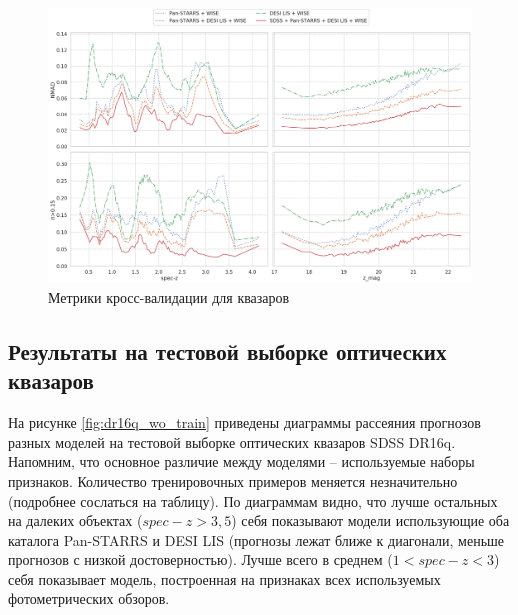 \documentclass[fleqn,usenatbib]{mnras}
\begin{document}
\begin{figure}
    \centering
    \includegraphics[width=0.9\linewidth]{images/metrics-cv2-qso.png}
    \caption{Метрики кросс-валидации для квазаров}
    \label{fig:metrics-cv2-qso}
\end{figure}

\subsection{Результаты на тестовой выборке оптических квазаров}

На рисунке \ref{fig:dr16q_wo_train} приведены диаграммы рассеяния прогнозов разных моделей на тестовой выборке оптических квазаров SDSS DR16q. Напомним, что основное различие между моделями -- используемые наборы признаков. Количество тренировочных примеров меняется незначительно (подробнее сослаться на таблицу). По диаграммам видно, что  лучше остальных на далеких объектах ($spec-z > 3,5$) себя показывают модели использующие оба каталога Pan-STARRS и DESI LIS (прогнозы лежат ближе к диагонали, меньше прогнозов с низкой достоверностью). Лучше всего в среднем ($1 < spec-z < 3$) себя показывает модель, построенная на признаках всех используемых фотометрических обзоров.
\end{document}
